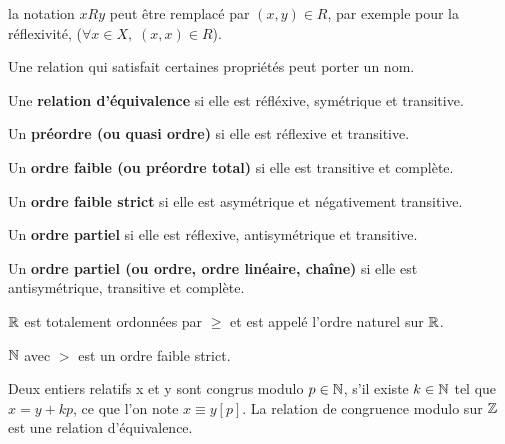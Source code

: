 \documentclass[a4paper, 12pt]{article}
\begin{document}
\begin{remark}
    la notation $xRy$ peut être remplacé par $(x, y) \in R$, par exemple pour la réflexivité, ($\forall x \in X, \; (x, x) \in R$).
\end{remark}

\vspace{2em}

Une relation qui satisfait certaines propriétés peut porter un nom.

\begin{definition}
\item Une \textbf{relation d'équivalence} si elle est réfléxive, symétrique et transitive.
\item Un \textbf{préordre (ou quasi ordre)} si elle est réflexive et transitive.
\item Un \textbf{ordre faible (ou préordre total)} si elle est transitive et complète.
\item Un \textbf{ordre faible strict} si elle est asymétrique et négativement transitive.
\item Un \textbf{ordre partiel} si elle est réflexive, antisymétrique et transitive.
\item Un \textbf{ordre partiel (ou ordre, ordre linéaire, chaîne)} si elle est antisymétrique, transitive et complète.
\end{definition}

\begin{example}
\item $\mathbb{R}$ est totalement ordonnées par $\geq$ et est appelé l'ordre naturel sur $\mathbb{R}$.
\item $\mathbb{N}$ avec $\gt$ est un ordre faible strict.
\item Deux entiers relatifs x et y sont congrus modulo $p \in \mathbb{N}$, s'il existe $k \in \mathbb{N}$ tel que $x = y + kp$, ce que l'on note $x \equiv y[p]$.
    La relation de congruence modulo sur $\mathbb{Z}$ est une relation d'équivalence.
\end{example}
\end{document}
